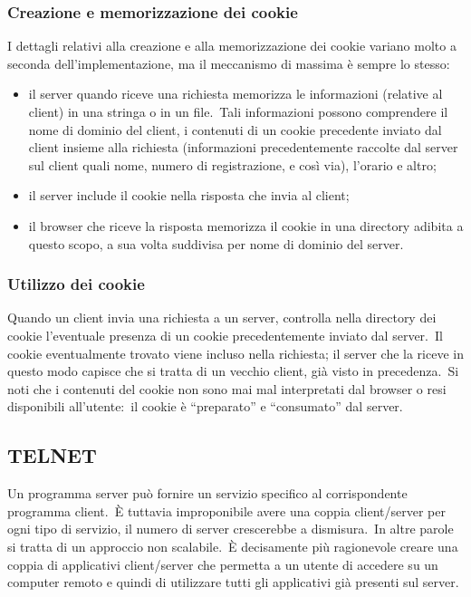 \subsubsection{Creazione e memorizzazione dei cookie}

I dettagli relativi alla creazione e alla memorizzazione dei cookie variano molto a seconda dell'implementazione, ma il meccanismo di massima è sempre lo stesso:
\begin{itemize}
    \item il server quando riceve una richiesta memorizza le informazioni (relative al client) in una stringa o in un file.\ Tali informazioni possono comprendere il nome di dominio del client, i contenuti di un cookie precedente inviato dal client insieme alla richiesta (informazioni precedentemente raccolte dal server sul client quali nome, numero di registrazione, e così via), l'orario e altro;
    \item il server include il cookie nella risposta che invia al client;
    \item il browser che riceve la risposta memorizza il cookie in una directory adibita a questo scopo, a sua volta suddivisa per nome di dominio del server.
\end{itemize}

\subsubsection{Utilizzo dei cookie}

Quando un client invia una richiesta a un server, controlla nella directory dei cookie l'eventuale presenza di un cookie precedentemente inviato dal server.\
Il cookie eventualmente trovato viene incluso nella richiesta; il server che la riceve in questo modo capisce che si tratta di un vecchio client, già visto in precedenza.\
Si noti che i contenuti del cookie non sono mai mal interpretati dal browser o resi disponibili all'utente:\ il cookie è ``preparato'' e ``consumato'' dal server.

\subsection{TELNET}

Un programma server può fornire un servizio specifico al corrispondente programma client.\
È tuttavia improponibile avere una coppia client/server per ogni tipo di servizio, il numero di server crescerebbe a dismisura.\
In altre parole si tratta di un approccio non scalabile.\
È decisamente più ragionevole creare una coppia di applicativi client/server che permetta a un utente di accedere su un computer remoto e quindi di utilizzare tutti gli applicativi già presenti sul server.

